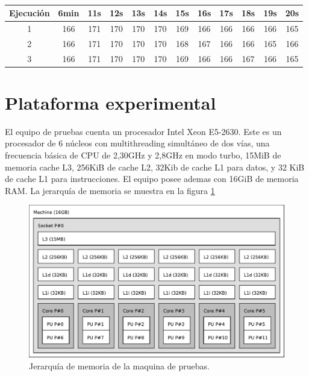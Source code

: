 \begin{table}[h]
	\centering
	\begin{tabular}{c|c|c|c|c|c|c|c|c|c|c|c}

		Ejecución&6min&11s&12s&13s&14s&15s&16s&17s&18s&19s&20s\\

		\hline

		1&166& 171& 170& 170& 170& 169& 166& 166& 166& 166& 165\\

		\hline

		2&166& 171& 170& 170& 170& 168& 167& 166& 166& 165& 166\\

		\hline

		3&166& 171& 170& 170& 170& 169& 166& 166& 167& 166& 165

	\end{tabular}

\caption{}

\label{tabla}

\end{table}

\section{Plataforma experimental}

El equipo de pruebas cuenta un procesador Intel Xeon E5-2630. Este es un
procesador de 6 núcleos con multithreading simultáneo de dos vías, una
frecuencia básica de CPU de 2,30GHz y 2,8GHz en modo turbo, 15MiB de memoria
cache L3, 256KiB de cache L2, 32Kib de cache L1 para datos, y 32 KiB de cache L1
para instrucciones. El equipo posee ademas con 16GiB de memoria RAM. La
jerarquía de memoria se muestra en la figura \ref{topoMemoria}

\begin{figure}[!ht]

	\includegraphics[width=\textwidth]{img/topo.pdf}
	\caption{Jerarquía de memoria de la maquina de pruebas.}

	\label{topoMemoria}

\end{figure}

